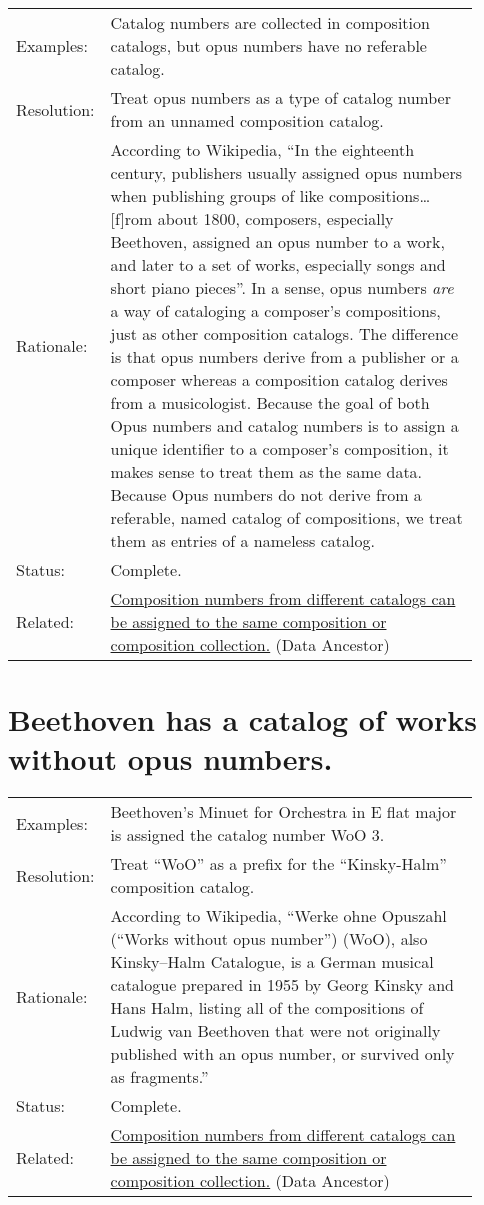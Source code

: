 \documentclass[letterpaper]{report}
\begin{document}
\begin{tabular}{ p{0.1\linewidth} p{0.825\linewidth} }
  Examples: & Catalog numbers are collected in composition catalogs, but opus numbers have no referable catalog. \\ 
  Resolution: & Treat opus numbers as a type of catalog number from an unnamed composition catalog. \\
  Rationale: & According to Wikipedia, ``In the eighteenth century, publishers usually assigned opus numbers when publishing groups of like compositions\ldots[f]rom about 1800, composers, especially Beethoven, assigned an opus number to a work, and later to a set of works, especially songs and short piano pieces''. In a sense, opus numbers \textit{are} a way of cataloging a composer's compositions, just as other composition catalogs. The difference is that opus numbers derive from a publisher or a composer whereas a composition catalog derives from a musicologist. Because the goal of both Opus numbers and catalog numbers is to assign a unique identifier to a composer's composition, it makes sense to treat them as the same data. Because Opus numbers do not derive from a referable, named catalog of compositions, we treat them as entries of a nameless catalog. \\
  Status: & Complete. \\
  Related: & \hyperref[D.2]{Composition numbers from different catalogs can be assigned to the same composition or composition collection.} (Data Ancestor)
\end{tabular}

\section{Beethoven has a catalog of works without opus numbers.}
\label{D.4}

\begin{tabular}{ p{0.1\linewidth} p{0.825\linewidth} }
  Examples: & Beethoven's Minuet for Orchestra in E flat major is assigned the catalog number WoO 3. \\ 
  Resolution: & Treat ``WoO'' as a prefix for the ``Kinsky-Halm'' composition catalog. \\
  Rationale: & According to Wikipedia, ``Werke ohne Opuszahl (``Works without opus number'') (WoO), also Kinsky–Halm Catalogue, is a German musical catalogue prepared in 1955 by Georg Kinsky and Hans Halm, listing all of the compositions of Ludwig van Beethoven that were not originally published with an opus number, or survived only as fragments.'' \\
  Status: & Complete. \\
  Related: & \hyperref[D.2]{Composition numbers from different catalogs can be assigned to the same composition or composition collection.} (Data Ancestor)
\end{tabular}
\end{document}
